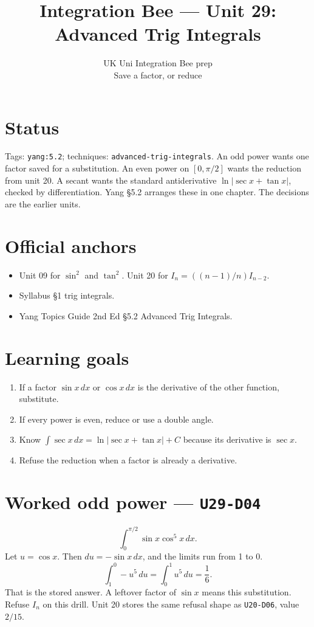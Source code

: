 
\title{Integration Bee --- Unit 29:\\ Advanced Trig Integrals}
\author{UK Uni Integration Bee prep\\ Save a factor, or reduce}
\date{}

\maketitle
\section*{Status}
Tags: \texttt{yang:5.2}; techniques: \texttt{advanced-trig-integrals}.
An odd power wants one factor saved for a substitution. An even power on $[0,\pi/2]$ wants the reduction from unit 20. A secant wants the standard antiderivative $\ln|\sec x+\tan x|$, checked by differentiation. Yang \S5.2 arranges these in one chapter. The decisions are the earlier units.
\section{Official anchors}
\begin{itemize}
\item Unit 09 for $\sin^2$ and $\tan^2$. Unit 20 for $I_n=((n-1)/n)I_{n-2}$.
\item Syllabus \S1 trig integrals.
\item Yang Topics Guide 2nd Ed \S5.2 Advanced Trig Integrals.
\end{itemize}
\section{Learning goals}
\begin{enumerate}
  \item If a factor $\sin x\,dx$ or $\cos x\,dx$ is the derivative of the other function, substitute.
  \item If every power is even, reduce or use a double angle.
  \item Know $\int\sec x\,dx=\ln|\sec x+\tan x|+C$ because its derivative is $\sec x$.
  \item Refuse the reduction when a factor is already a derivative.
\end{enumerate}

\section{Worked odd power --- \texttt{U29-D04}}
\[
\int_0^{\pi/2}\sin x\cos^5 x\,dx.
\]
Let $u=\cos x$. Then $du=-\sin x\,dx$, and the limits run from 1 to 0.
\[
\int_1^0 -u^5\,du=\int_0^1 u^5\,du=\frac16.
\]
That is the stored answer. A leftover factor of $\sin x$ means this substitution. Refuse $I_n$ on this drill. Unit 20 stores the same refusal shape as \texttt{U20-D06}, value $2/15$.

